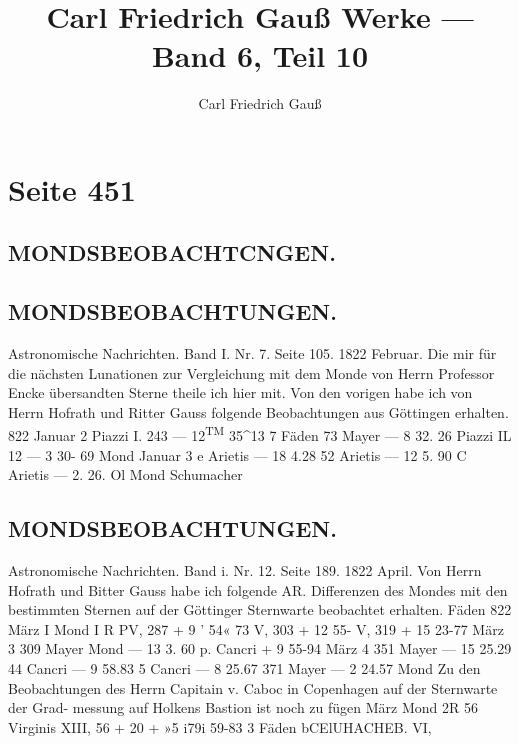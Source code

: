 \documentclass[10pt,a4paper]{article}
\title{Carl Friedrich Gau\ss{} Werke --- Band 6, Teil 10}
\author{Carl Friedrich Gau\ss}
\date{}
\begin{document}
\maketitle
\thispagestyle{fancy}


\newpage
\section*{Seite 451}

\subsection*{MONDSBEOBACHTCNGEN.}

\subsection*{MONDSBEOBACHTUNGEN.}

Astronomische  Nachrichten.     Band  I.  Nr.  7.  Seite  105.     1822  Februar.
Die  mir  für  die  nächsten  Lunationen  zur  Vergleichung  mit  dem  Monde  von  Herrn  Professor  Encke
übersandten  Sterne  theile  ich  hier  mit.  Von  den  vorigen  habe  ich  von  Herrn  Hofrath  und  Ritter  Gauss
folgende  Beobachtungen  aus  Göttingen  erhalten.
822  Januar  2
Piazzi  I.  243
--- 12\textsuperscript{TM}  35\textasciicircum{}13
7  Fäden
73  Mayer
---    8     32. 26
Piazzi  IL  12
---    3     30-  69
Mond
Januar  3
e  Arietis
---  18       4.28
52  Arietis
---  12       5.  90
C  Arietis
---    2.     26.  Ol
Mond
Schumacher
\subsection*{MONDSBEOBACHTUNGEN.}

Astronomische  Nachrichten.     Band  i.  Nr.  12.  Seite  189.     1822  April.
Von  Herrn  Hofrath    und  Bitter  Gauss   habe   ich  folgende   AR.  Differenzen   des  Mondes   mit  den
bestimmten  Sternen  auf  der  Göttinger  Sternwarte  beobachtet  erhalten.
Fäden
822  März  I
Mond  I  R
PV,  287
+    9\glqq{}
'  54« 73
V,  303
+  12
55- \glqq{}
V,  319
+  15
23-77
März  3
309  Mayer
Mond
---  13
3.  60
p.  Cancri
+    9
55-94
März  4
351  Mayer
---  15
25.29
44  Cancri
---    9
58.83
5  Cancri
---    8
25.67
371  Mayer
---    2
24.57
Mond
Zu  den  Beobachtungen  des  Herrn  Capitain  v.  Caboc  in  Copenhagen  auf  der  Sternwarte  der  Grad-
messung auf  Holkens  Bastion  ist  noch  zu  fügen
März
Mond  2R
56  Virginis
XIII,  56
+  20\glqq{}
+  »5
i7\glqq{}9i
59-83
3  Fäden
bCElUHACHEB.
VI,
\end{document}
